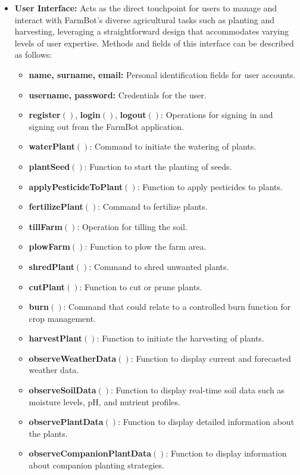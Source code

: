 \begin{itemize}
    \item \textbf{User Interface:} Acts as the direct touchpoint for users to manage and interact with FarmBot's diverse agricultural tasks such as planting and harvesting, leveraging a straightforward design that accommodates varying levels of user expertise. Methods and fields of this interface
    can be described as follows:
    \begin{itemize}
        \item \textbf{name, surname, email:} Personal identification fields for user accounts.
        \item \textbf{username, password:} Credentials for the user.
        \item \textbf{register}$()$, \textbf{login}$()$, \textbf{logout}$()$: Operations for signing in and signing out from the FarmBot application.
        \item \textbf{waterPlant}$()$: Command to initiate the watering of plants.
        \item \textbf{plantSeed}$()$: Function to start the planting of seeds.
        \item \textbf{applyPesticideToPlant}$()$: Function to apply pesticides to plants.
        \item \textbf{fertilizePlant}$()$: Command to fertilize plants.
        \item \textbf{tillFarm}$()$: Operation for tilling the soil.
        \item \textbf{plowFarm}$()$: Function to plow the farm area.
        \item \textbf{shredPlant}$()$: Command to shred unwanted plants.
        \item \textbf{cutPlant}$()$: Function to cut or prune plants.
        \item \textbf{burn}$()$: Command that could relate to a controlled burn function for crop management.
        \item \textbf{harvestPlant}$()$: Function to initiate the harvesting of plants.
        \item \textbf{observeWeatherData}$()$: Function to display current and forecasted weather data.
        \item \textbf{observeSoilData}$()$: Function to display real-time soil data such as moisture levels, pH, and nutrient profiles.
        \item \textbf{observePlantData}$()$: Function to display detailed information about the plants.
        \item \textbf{observeCompanionPlantData}$()$: Function to display information about companion planting strategies.

\end{itemize}
\end{itemize}
